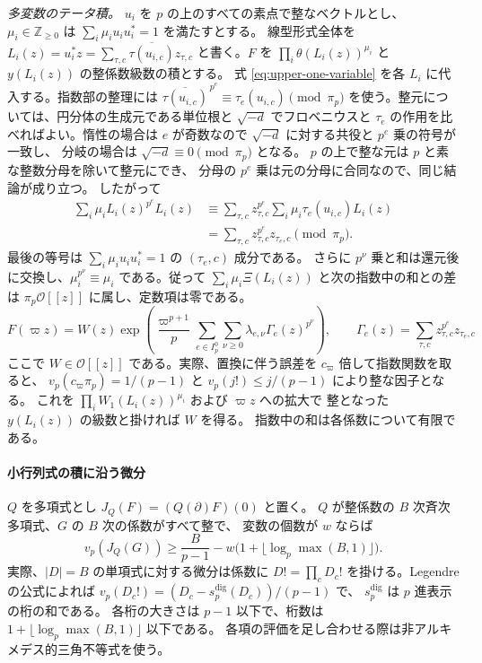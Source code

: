 \emph{多変数のテータ積。}
\(u_i\) を \(p\) の上のすべての素点で整なベクトルとし、
\(\mu_i\in\mathbb Z_{\ge0}\) は \(\sum_i\mu_i u_i u_i^\ast=1\) を満たすとする。
線型形式全体を \(L_i(z)=u_i^\ast z=\sum_{\tau,c}\overline{\tau(u_{i,c})}z_{\tau,c}\)
と書く。\(F\) を \(\prod_i\theta(L_i(z))^{\mu_i}\) と
\(y(L_i(z))\) の整係数級数の積とする。
式 \eqref{eq:upper-one-variable} を各 \(L_i\) に代入する。指数部の整理には
\(\overline{\tau(u_{i,c})}^{\,p^e}\equiv\tau_e(u_{i,c})\pmod{\pi_p}\)
を使う。整元については、円分体の生成元である単位根と \(\sqrt{-d}\)
でフロベニウスと \(\tau_e\) の作用を比べればよい。惰性の場合は
\(e\) が奇数なので \(\sqrt{-d}\) に対する共役と \(p^e\) 乗の符号が一致し、
分岐の場合は \(\sqrt{-d}\equiv0\pmod{\pi_p}\) となる。
\(p\) の上で整な元は \(p\) と素な整数分母を除いて整元にでき、
分母の \(p^e\) 乗は元の分母に合同なので、同じ結論が成り立つ。
したがって
\[
 \begin{aligned}
 \sum_i\mu_i L_i(z)^{p^e}L_i(z)
 &\equiv \sum_{\tau,c}z_{\tau,c}^{p^e}
              \sum_i\mu_i\tau_e(u_{i,c}) L_i(z)\\
 &=\sum_{\tau,c} z_{\tau,c}^{p^e}z_{\tau_e,c}\pmod{\pi_p}.
 \end{aligned}
\]
最後の等号は \(\sum_i\mu_i u_i u_i^\ast=1\) の \((\tau_e,c)\) 成分である。
さらに \(p^\nu\) 乗と和は還元後に交換し、\(\mu_i^{p^\nu}\equiv\mu_i\)
である。従って \(\sum_i\mu_i\Xi(L_i(z))\) と次の指数中の和との差は
\(\pi_p\mathcal O[[z]]\) に属し、定数項は零である。
\begin{equation}\label{eq:upper-normal}
 F(\varpi z)=W(z)\exp\!\left(
       \frac{\varpi^{p+1}}{p}
       \sum_{e\in I_p^0}\sum_{\nu\ge0}\lambda_{e,\nu}\Gamma_e(z)^{p^\nu}
                              \right),
 \qquad
 \Gamma_e(z)=\sum_{\tau,c}z_{\tau,c}^{p^e}z_{\tau_e,c}
\end{equation}
ここで \(W\in\mathcal O[[z]]\) である。実際、置換に伴う誤差を
\(c_\varpi\) 倍して指数関数を取ると、
\(v_p(c_\varpi\pi_p)=1/(p-1)\) と \(v_p(j!)\le j/(p-1)\) により整な因子となる。
これを \(\prod_i W_1(L_i(z))^{\mu_i}\) および \(\varpi z\) への拡大で
整となった \(y(L_i(z))\) の級数と掛ければ \(W\) を得る。
指数中の和は各係数について有限である。

\paragraph{小行列式の積に沿う微分}
\(Q\) を多項式とし \(J_Q(F)=(Q(\partial)F)(0)\) と置く。
\(Q\) が整係数の \(B\) 次斉次多項式、\(G\) の \(B\) 次の係数がすべて整で、
変数の個数が \(w\) ならば
\begin{equation}\label{eq:upper-legendre}
  v_p(J_Q(G))\ge
  \frac{B}{p-1}-w\bigl(1+\lfloor\log_p\max(B,1)\rfloor\bigr).
\end{equation}
実際、\(|D|=B\) の単項式に対する微分は係数に \(D!=\prod_c D_c!\)
を掛ける。Legendre の公式によれば
\(v_p(D_c!)=(D_c-s_p^{\mathrm{dig}}(D_c))/(p-1)\) で、
\(s_p^{\mathrm{dig}}\) は \(p\) 進表示の桁の和である。
各桁の大きさは \(p-1\) 以下で、桁数は
\(1+\lfloor\log_p\max(B,1)\rfloor\) 以下である。
各項の評価を足し合わせる際は非アルキメデス的三角不等式を使う。

